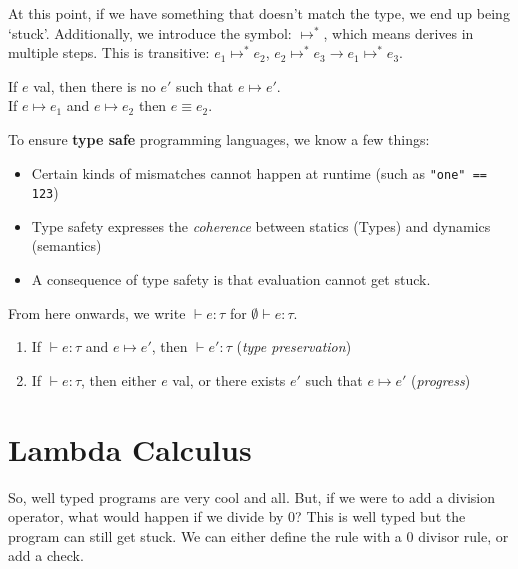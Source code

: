 \documentclass[11pt,a4paper,titlepage,dvipsnames,cmyk]{scrartcl}
\begin{document}
At this point, if we have something that doesn't match the type, we end up being `stuck'. Additionally, we introduce the symbol: $\longmapsto^*$, which means derives in multiple steps. This is transitive: $e_1 \longmapsto^* e_2$, $e_2 \longmapsto^* e_3 \rightarrow e_1 \longmapsto^* e_3$.

\begin{tcolorbox} [space to upper,
collower=white,
title={Propositions},
nobeforeafter,
halign lower=flush right, ]
    \begin{center}
    If $e$ val, then there is no $e'$ such that $e \longmapsto e'$. \\
    If $e \longmapsto e_1$ and $e \longmapsto e_2$ then $e \equiv e_2$.
    \end{center}
\end{tcolorbox}

To ensure \textbf{type safe} programming languages, we know a few things:
\begin{itemize}
    \item Certain kinds of mismatches cannot happen at runtime (such as \texttt{"one" == 123})
    \item Type safety expresses the \textit{coherence} between statics (Types) and dynamics (semantics)
    \item A consequence of type safety is that evaluation cannot get stuck.
\end{itemize}

From here onwards, we write $\vdash e : \tau$ for $\emptyset \vdash e : \tau$.

\begin{tcolorbox} [space to upper,
collower=white,
title={Theorem (type safety)},
nobeforeafter,
halign lower=flush right, ]
\begin{enumerate}
\item If $\vdash e : \tau$ and $e \longmapsto e'$, then $\vdash e' : \tau$ (\textit{type preservation})
\item If $\vdash e : \tau$, then either $e$ val, or there exists $e'$ such that $e \longmapsto e'$ (\textit{progress})
\end{enumerate}
\end{tcolorbox}

\section{Lambda Calculus}
So, well typed programs are very cool and all. But, if we were to add a division operator, what would happen if we divide by 0? This is well typed but the program can still get stuck. We can either define the rule with a 0 divisor rule, or add a check.
\end{document}
